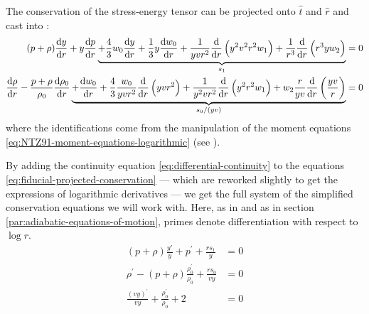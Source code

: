 \documentclass[main.tex]{subfiles}
\begin{document}
The conservation of the stress-energy tensor can be projected onto \(\hat{t}\) and \(\hat{r}\) and cast into \cite[eq. A7]{NobiliTurollaZampieri:1991dec}:
%
\begin{subequations} \label{eq:fiducial-projected-conservation}
\begin{align}
    (p+\rho) \dv{y}{r}
    +y \dv{p}{r}
    \underbrace{
    +\frac{4}{3} w_{0} \dv{y}{r}
    +\frac{1}{3} y \dv{w_0}{r}
    +\frac{1}{y v r^{2}} \dv{}{r}\left(y^{2} v^{2} r^{2} w_{1}\right)
    +\frac{1}{r^{3}} \dv{}{r}\left(r^{3} y w_{2}\right)}_{s_1} &=0 \\
    \dv{\rho}{r}
    -\frac{p+\rho}{\rho_{0}}
    \dv{\rho_{0}}{r}
    \underbrace{
    +\dv{w_0}{r}
    +\frac{4}{3} \frac{w_{0}}{y v r^{2}} \dv{}{r}\left(y v r^{2}\right)
    +\frac{1}{y^{2} v r^{2}} \dv{}{r}\left(y^{2} r^{2} w_{1}\right)
    +w_{2} \frac{r}{y v} \dv{}{r}\left(\frac{y v}{r}\right)}_{s_0/(yv)} &=0
\end{align}
\end{subequations}
%
where the identifications come from the manipulation of the moment equations \eqref{eq:NTZ91-moment-equations-logarithmic} (see \cite[eq. A8]{NobiliTurollaZampieri:1991dec}).

By adding the continuity equation \eqref{eq:differential-continuity} to the equations \eqref{eq:fiducial-projected-conservation} --- which are reworked slightly to get the expressions of logarithmic derivatives --- we get the full system of the simplified conservation equations we will work with. Here, as in \cite[]{NobiliTurollaZampieri:1991dec} and as in section \ref{par:adiabatic-equations-of-motion}, primes denote differentiation with respect to \(\log r\).
%
\begin{subequations}
\begin{align}
  (p + \rho) \frac{y'}{y} + p^\prime + \frac{r s_1}{y}  &= 0  \\
  \rho^\prime - (p + \rho) \frac{\rho_0^\prime}{\rho_0} + \frac{r s_0}{vy}   &=0  \\
  \frac{(vy)^\prime}{vy} + \frac{\rho_0 ^\prime}{\rho_0} + 2 &=0
\end{align}
\end{subequations}
\end{document}
